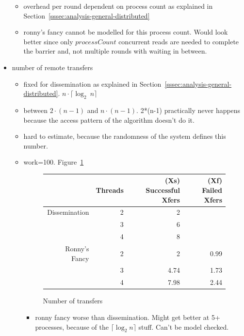 \documentclass[a4paper, 10pt]{article}
\begin{document}
\begin{itemize}
\begin{itemize}
			\item overhead per round dependent on process count as explained in Section~\ref{sssec:analysis-general-distributed}
			\item ronny's fancy cannot be modelled for this process count. Would look better since only $\mathit{processCount}$ concurrent reads are needed to complete the barrier and, not multiple rounds with waiting in between.
		\end{itemize}
	\item number of remote transfers
		\begin{itemize}
			\item fixed for dissemination as explained in Section~\ref{sssec:analysis-general-distributed}. $n \cdot \lceil \log _2~n \rceil$
			\item between $2 \cdot (n-1)$ and $n \cdot (n-1)$. 2*(n-1) practically never happens because the access pattern of the algorithm doesn't do it.
			\item hard to estimate, because the randomness of the system defines this number.
			\item work=100. Figure~\ref{fig:df-transfers-100}
				\begin{figure}[htbp]
					\centering
					\begin{tabular}{r | r | r r}
						              & Threads & (Xs) Successful Xfers & (Xf) Failed Xfers \\
						\hline
						Dissemination & 2       & 2                     &                   \\
						              & 3       & 6                     &                   \\
						              & 4       & 8                     &                   \\
						\hline
						Ronny's Fancy & 2       & 2                     & 0.99              \\
						              & 3       & 4.74                  & 1.73              \\
						              & 4       & 7.98                  & 2.44              \\
					\end{tabular}
					\caption{Number of transfers}
					\label{fig:df-transfers-100}
				\end{figure}
				\begin{itemize}
					\item ronny fancy worse than dissemination. Might get better at 5+ processes, because of the $\lceil \log_2 n \rceil$ stuff. Can't be model checked.

\end{itemize}
\end{itemize}
\end{itemize}
\end{document}
